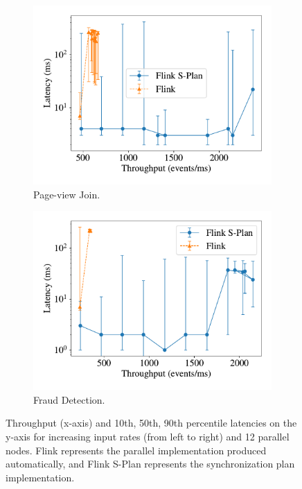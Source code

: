 \begin{figure}[t]
    \centering
    \begin{subfigure}[b]{0.35\textwidth}
      \centering
      \includegraphics[width=\textwidth]{figures/dgs/pageview-flink-splan.pdf}
      \caption{Page-view Join.}
      \label{fig:synchronization-plan-page-view-join-throughput}
    \end{subfigure}
    \hspace{0.05\textwidth}
    \begin{subfigure}[b]{0.35\textwidth}
      \centering
      \includegraphics[width=\textwidth]{figures/dgs/frauds-flink-splan.pdf}
      \caption{Fraud Detection.
      }
      \label{fig:synchronization-plan-fraud-detection-throughput}
    \end{subfigure}
    \caption{
      Throughput (x-axis) and 10th, 50th, 90th percentile latencies on the y-axis for increasing input rates (from left to right) and 12 parallel nodes. Flink represents the parallel implementation produced automatically, and Flink S-Plan represents the synchronization plan implementation.
      }
    \label{fig:synchronization-plan-throughputs-flink}
\end{figure}

